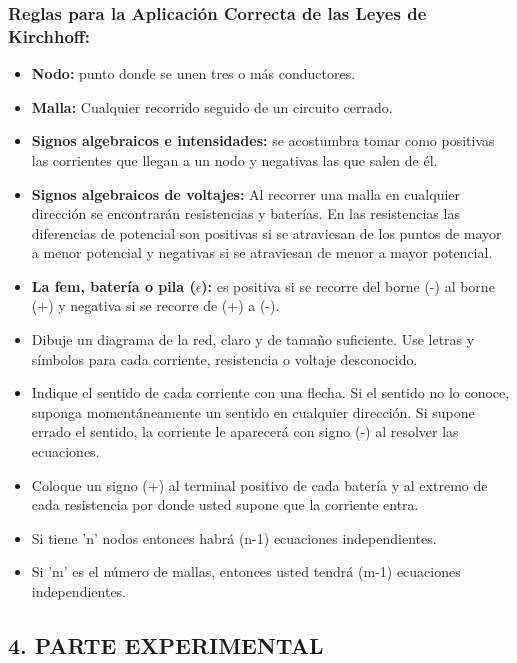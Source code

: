 \documentclass[12pt, a4paper]{article}
\begin{document}
\subsubsection*{Reglas para la Aplicación Correcta de las Leyes de Kirchhoff:}
\begin{itemize}
    \item \textbf{Nodo:} punto donde se unen tres o más conductores.
    \item \textbf{Malla:} Cualquier recorrido seguido de un circuito cerrado.
    \item \textbf{Signos algebraicos e intensidades:} se acostumbra tomar como positivas las corrientes que llegan a 
    un nodo y negativas las que salen de él.
    \item \textbf{Signos algebraicos de voltajes:} Al recorrer una malla en cualquier dirección se encontrarán resistencias 
    y baterías. En las resistencias las diferencias de potencial son positivas si se atraviesan de los puntos de mayor a menor 
    potencial y negativas si se atraviesan de menor a mayor potencial.
    \item \textbf{La fem, batería o pila ($\epsilon$):} es positiva si se recorre del borne (-) al borne (+) y negativa si se 
    recorre de (+) a (-).
    \item Dibuje un diagrama de la red, claro y de tamaño suficiente. Use letras y símbolos para cada corriente, resistencia o 
    voltaje desconocido.
    \item Indique el sentido de cada corriente con una flecha. Si el sentido no lo conoce, suponga momentáneamente un sentido en 
    cualquier dirección. Si supone errado el sentido, la corriente le aparecerá con signo (-) al resolver las ecuaciones.
    \item Coloque un signo (+) al terminal positivo de cada batería y al extremo de cada resistencia por donde usted supone que 
    la corriente entra.
    \item Si tiene 'n' nodos entonces habrá (n-1) ecuaciones independientes.
    \item Si 'm' es el número de mallas, entonces usted tendrá (m-1) ecuaciones independientes.
\end{itemize}

\subsection*{4. PARTE EXPERIMENTAL}
\end{document}
